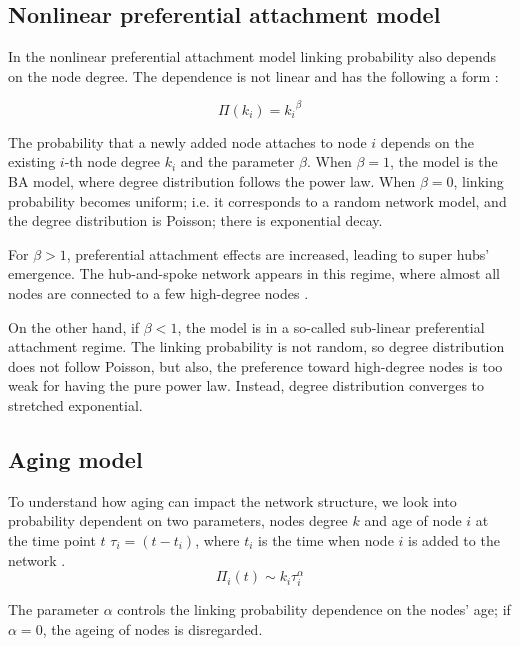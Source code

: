 \subsection{Nonlinear preferential attachment model}

In the nonlinear preferential attachment model linking probability also depends on the node degree. The dependence is not linear and has the following a form \cite{krapivsky2001}:

\begin{equation}
\Pi(k_i) = {k_i}^{\beta}
\end{equation} 

The probability that a newly added node attaches to node $i$ depends on the existing $i$-th node degree $k_i$ and the parameter $\beta$. When $\beta=1$, the model is the BA model, where degree distribution follows the power law. When $\beta=0$, linking probability becomes uniform; i.e. it corresponds to a random network model, and the degree distribution is Poisson; there is exponential decay. 

For $\beta>1$, preferential attachment effects are increased, leading to super hubs' emergence. The hub-and-spoke network appears in this regime, where almost all nodes are connected to a few high-degree nodes \cite{krapivsky2001}. %

On the other hand, if $\beta<1$, the model is in a so-called sub-linear preferential attachment regime. The linking probability is not random, so degree distribution does not follow Poisson, but also, the preference toward high-degree nodes is too weak for having the pure power law. Instead, degree distribution converges to stretched exponential.


\subsection{Aging model}

To understand how aging can impact the network structure, we look into probability dependent on two parameters, nodes degree $k$ and age of node $i$ at the time point $t$ $\tau_i=(t-t_i)$, where $t_i$ is the time when node $i$ is added to the network \cite{dorogovtsev2000b}. 
\begin{equation}
\Pi_{i}(t)\sim k_{i}\tau_{i}^{\alpha} 
\label{eq:aging}
\end{equation}

The parameter $\alpha$ controls the linking probability dependence on the nodes' age; if $\alpha=0$, the ageing of nodes is disregarded. 

